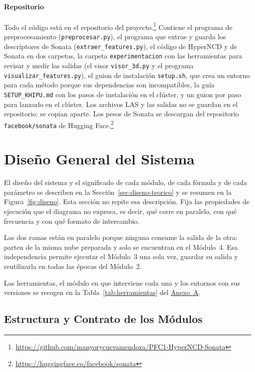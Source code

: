 \paragraph*{Repositorio}
Todo el código está en el repositorio del
proyecto.\footnote{\url{https://github.com/manyorycuevamendoza/PFC1-HyperNCD-Sonata}}
Contiene el programa de preprocesamiento (\texttt{preprocesar.py}), el programa
que extrae y guarda los descriptores de Sonata (\texttt{extraer\_features.py}),
el código de HyperNCD y de Sonata en dos carpetas, la carpeta
\texttt{experimentacion} con las herramientas para revisar y medir las salidas
(el visor \texttt{visor\_3d.py} y el programa \texttt{visualizar\_features.py}), el
guion de instalación \texttt{setup.sh}, que crea un entorno para cada método
porque sus dependencias son incompatibles, la guía \texttt{SETUP\_KHIPU.md} con
los pasos de instalación en el clúster, y un guion por paso para lanzarlo en el
clúster. Los archivos LAS y las salidas no se guardan en el repositorio; se
copian aparte. Los pesos de Sonata se descargan del repositorio
\texttt{facebook/sonata} de Hugging
Face.\footnote{\url{https://huggingface.co/facebook/sonata}}

\FloatBarrier
\section{Diseño General del Sistema}
\label{sec:diseno}

El diseño del sistema y el significado de cada módulo, de cada fórmula y de
cada parámetro se describen en la Sección~\ref{sec:diseno-teorico} y se resumen
en la Figura~\ref{fig:diseno}. Esta sección
no repite esa descripción. Fija las propiedades de ejecución que el diagrama no
expresa, es decir, qué corre en paralelo, con qué frecuencia y con qué formato
de intercambio.

Las dos ramas están en paralelo porque ninguna consume la salida de la otra:
parten de la misma nube preparada y solo se encuentran en el Módulo~4. Esa
independencia permite ejecutar el Módulo~3 una sola vez, guardar su salida y
reutilizarla en todas las épocas del Módulo~2.

Las herramientas, el módulo en que interviene cada una y los entornos con sus
versiones se recogen en la Tabla~\ref{tab:herramientas} del \hyperref[sec:anexo-software]{Anexo~A}.

\FloatBarrier
\subsection{Estructura y Contrato de los Módulos}
\label{sec:contrato}

